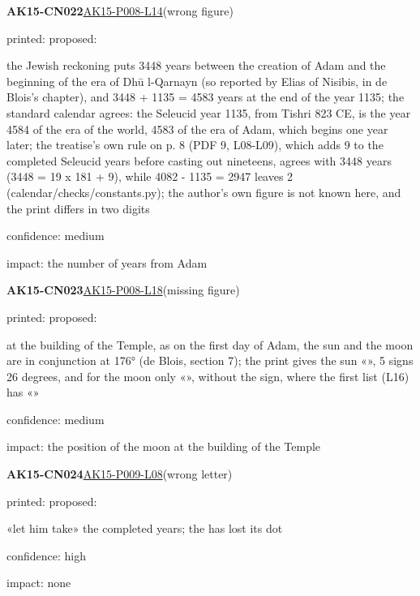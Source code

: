 \documentclass[11pt]{article}
\begin{document}
\noindent\textbf{AK15-CN022}\enspace\hyperlink{AK15-P008-L14}{AK15-P008-L14}\enspace(wrong figure)\par\noindent printed: \enspace proposed: \par\noindent the Jewish reckoning puts 3448 years between the creation of Adam and the beginning of the era of Dhū l-Qarnayn (so reported by Elias of Nisibis, in de Blois's chapter), and 3448 + 1135 = 4583 years at the end of the year 1135; the standard calendar agrees: the Seleucid year 1135, from Tishri 823 CE, is the year 4584 of the era of the world, 4583 of the era of Adam, which begins one year later; the treatise's own rule on p. 8 (PDF 9, L08-L09), which adds 9 to the completed Seleucid years before casting out nineteens, agrees with 3448 years (3448 = 19 x 181 + 9), while 4082 - 1135 = 2947 leaves 2 (calendar/checks/constants.py); the author's own figure is not known here, and the print differs in two digits\par\noindent confidence: medium\par\noindent impact: the number of years from Adam\par\medskip
\noindent\textbf{AK15-CN023}\enspace\hyperlink{AK15-P008-L18}{AK15-P008-L18}\enspace(missing figure)\par\noindent printed: \enspace proposed: \par\noindent at the building of the Temple, as on the first day of Adam, the sun and the moon are in conjunction at 176° (de Blois, section 7); the print gives the sun «», 5 signs 26 degrees, and for the moon only «», without the sign, where the first list (L16) has «»\par\noindent confidence: medium\par\noindent impact: the position of the moon at the building of the Temple\par\medskip
\noindent\textbf{AK15-CN024}\enspace\hyperlink{AK15-P009-L08}{AK15-P009-L08}\enspace(wrong letter)\par\noindent printed: \enspace proposed: \par\noindent «let him take» the completed years; the  has lost its dot\par\noindent confidence: high\par\noindent impact: none\par\medskip
\end{document}
